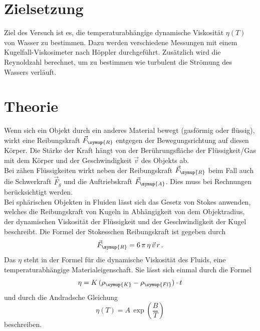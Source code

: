 \section{Zielsetzung}
    \label{sec:Zielsetzung}

    Ziel des Versuch ist es, die temperaturabhängige dynamische Viskosität $\eta(T)$ von Wasser zu bestimmen. Dazu werden verschiedene Messungen
    mit einem Kugelfall-Viskosimeter nach Höppler durchgeführt. Zusätzlich wird die Reynoldzahl berechnet, um zu bestimmen wie turbulent die Strömung
    des Wassers verläuft.

\section{Theorie}
    \label{sec:Theorie}
    Wenn sich ein Objekt durch ein anderes Material bewegt (gasförmig oder flüssig), wirkt eine Reibungskraft $\vec{F}_{\symup{R}}$ entgegen der
    Bewegungsrichtung auf diesen Körper. Die Stärke der Kraft hängt von der Berührungsfläche der Flüssigkeit/Gas mit dem Körper und der
    Geschwindigkeit $\vec{v}$ des Objekts ab. \\
    Bei zähen Flüssigkeiten wirkt neben der Reibungskraft $\vec{F}_{\symup{R}}$ beim Fall auch die Schwerkraft $\vec{F}_g$ und die Auftriebskraft $\vec{F}_{\symup{A}}$. Dies 
    muss bei Rechnungen berücksichtigt werden.\\
    Bei sphärischen Objekten in Fluiden lässt sich das Gesetz von Stokes anwenden, welches die Reibungskraft von Kugeln in Abhängigkeit von dem Objektradius,
    der dynamischen Viskosität der Flüssigkeit und der Geschwindigkeit der Kugel beschreibt. Die Formel der Stokesschen Reibungskraft ist gegeben durch
    \begin{equation}
        \label{eqn:Stokes}
        \vec{F}_{\symup{R}} = 6 \, \pi \, \eta \, \vec{v} \, r \, .
    \end{equation}
    Das $\eta$ steht in der Formel für die dynamische Viskosität des Fluids, eine temperaturabhängige Materialeigenschaft. Sie lässt sich einmal durch die Formel
    \begin{equation}
        \label{eqn:etaK}
        \eta = K \, (\rho_{\symup{K}} - \rho_{\symup{Fl}}) \cdot t
    \end{equation}
    und durch die Andradsche Gleichung
    \begin{equation}
        \label{eqn:Andrad}
        \eta(T) = A \, \exp{\left(\frac{B}{T}\right)}
    \end{equation}
    beschreiben.\\
